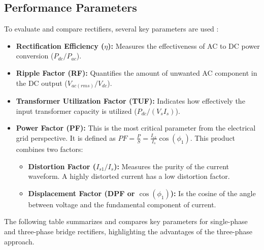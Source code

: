 \documentclass[12pt,a4paper]{article}
\begin{document}
\subsection{Performance Parameters}

To evaluate and compare rectifiers, several key parameters are used \cite{rashid2014}:

\begin{itemize}
    \item \textbf{Rectification Efficiency ($\eta$):} Measures the effectiveness of AC to DC power conversion ($P_{dc}/P_{ac}$).
    
    \item \textbf{Ripple Factor (RF):} Quantifies the amount of unwanted AC component in the DC output ($V_{ac(rms)}/V_{dc}$).
    
    \item \textbf{Transformer Utilization Factor (TUF):} Indicates how effectively the input transformer capacity is utilized ($P_{dc}/(V_s I_s)$).
    
    \item \textbf{Power Factor (PF):} This is the most critical parameter from the electrical grid perspective. It is defined as $PF = \frac{P}{S} = \frac{I_{s1}}{I_s} \cos(\phi_1)$. This product combines two factors:
    \begin{itemize}
        \item \textbf{Distortion Factor ($I_{s1}/I_s$):} Measures the purity of the current waveform. A highly distorted current has a low distortion factor.
        \item \textbf{Displacement Factor (DPF or $\cos(\phi_1)$):} Is the cosine of the angle between voltage and the fundamental component of current.
    \end{itemize}
\end{itemize}

The following table summarizes and compares key parameters for single-phase and three-phase bridge rectifiers, highlighting the advantages of the three-phase approach.
\end{document}

